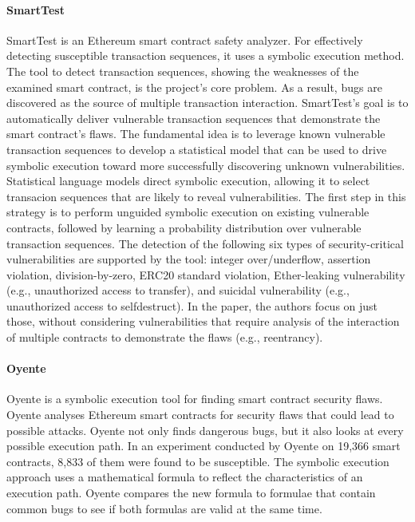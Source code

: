 \documentclass[a4paper,sigconf, language=french,
language=german, language=spanish, language=english]{acmart}
\begin{document}
\paragraph{SmartTest}SmartTest is an Ethereum smart contract safety analyzer.
For effectively detecting susceptible transaction sequences, it uses a symbolic execution method.
The tool to detect transaction sequences, showing the weaknesses of the examined smart contract, is the project's core problem.
As a result, bugs are discovered as the source of multiple transaction interaction.
SmartTest's goal is to automatically deliver vulnerable transaction sequences that demonstrate the smart contract's flaws. 
The fundamental idea is to leverage known vulnerable transaction sequences to develop a statistical model that can be used to drive symbolic execution 
toward more successfully discovering unknown vulnerabilities.
Statistical language models direct symbolic execution, allowing it to select transacion sequences that are likely to reveal vulnerabilities.
The first step in this strategy is to perform unguided symbolic execution on existing vulnerable contracts, followed by learning a probability 
distribution over vulnerable transaction sequences. The detection of the following six types of security-critical vulnerabilities are supported
by the tool: integer over/underflow, assertion violation, division-by-zero, ERC20 standard
violation, Ether-leaking vulnerability (e.g., unauthorized access to transfer), and suicidal
vulnerability (e.g., unauthorized access to selfdestruct). In the paper, the authors focus on
just those, without considering vulnerabilities that require analysis of the interaction of
multiple contracts to demonstrate the flaws (e.g., reentrancy).

\paragraph{Oyente}Oyente is a symbolic execution tool for finding smart contract security flaws.
Oyente analyses Ethereum smart contracts for security flaws that could lead to possible attacks.
Oyente not only finds dangerous bugs, but it also looks at every possible execution path.
In an experiment conducted by Oyente on 19,366 smart contracts, 8,833 of them were found to be susceptible.
The symbolic execution approach uses a mathematical formula to reflect the characteristics of an execution path.
Oyente compares the new formula to formulae that contain common bugs to see if both formulas are valid at the same time. 
\end{document}
